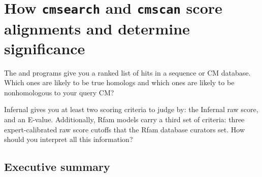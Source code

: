 \section{How \texttt{cmsearch} and \texttt{cmscan} score alignments and determine significance}

The  and  programs give you a ranked list
of hits in a sequence or CM database.  Which ones are likely to be
true homologs and which ones are likely to be nonhomologous to your
query CM?

Infernal gives you at least two scoring criteria to judge
by: the Infernal raw score, and an E-value. Additionally,
Rfam models carry a third set of criteria: three expert-calibrated raw
score cutoffs that the Rfam database curators set. How should you
interpret all this information?

\subsection{Executive summary}

